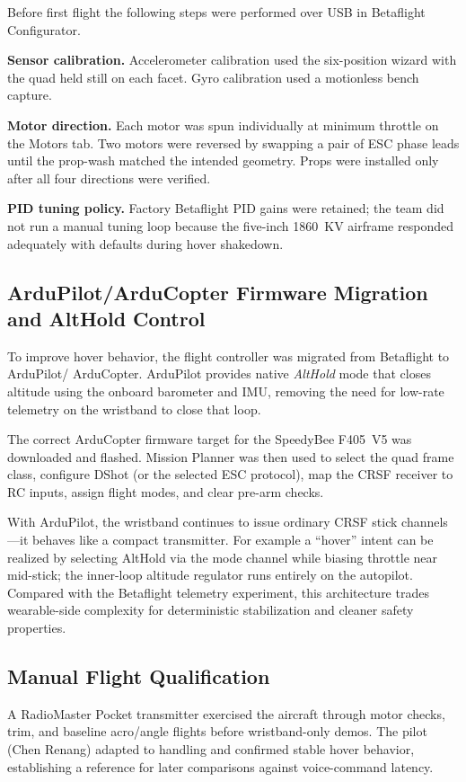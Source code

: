 Before first flight the following steps were performed over USB in Betaflight Configurator.

\textbf{Sensor calibration.}
Accelerometer calibration used the six-position wizard with the quad held still on each facet.
Gyro calibration used a motionless bench capture.

\textbf{Motor direction.}
Each motor was spun individually at minimum throttle on the Motors tab.
Two motors were reversed by swapping a pair of ESC phase leads until the prop-wash matched the
intended geometry.
Props were installed only after all four directions were verified.

\textbf{PID tuning policy.}
Factory Betaflight PID gains were retained; the team did not run a manual tuning loop because
the five-inch 1860~KV airframe responded adequately with defaults during hover shakedown.

\subsection{ArduPilot/ArduCopter Firmware Migration and AltHold Control}

To improve hover behavior, the flight controller was migrated from Betaflight to ArduPilot/
ArduCopter.
ArduPilot provides native \emph{AltHold} mode that closes altitude using the onboard barometer and
IMU, removing the need for low-rate telemetry on the wristband to close that loop.

The correct ArduCopter firmware target for the SpeedyBee F405~V5 was downloaded and flashed.
Mission Planner was then used to select the quad frame class, configure DShot (or the selected ESC
protocol), map the CRSF receiver to RC inputs, assign flight modes, and clear pre-arm checks.

With ArduPilot, the wristband continues to issue ordinary CRSF stick channels---it behaves like a
compact transmitter.
For example a ``hover'' intent can be realized by selecting AltHold via the mode channel while biasing
throttle near mid-stick; the inner-loop altitude regulator runs entirely on the autopilot.
Compared with the Betaflight telemetry experiment, this architecture trades wearable-side complexity
for deterministic stabilization and cleaner safety properties.

\subsection{Manual Flight Qualification}

A RadioMaster Pocket transmitter exercised the aircraft through motor checks, trim, and baseline
acro/angle flights before wristband-only demos.
The pilot (Chen Renang) adapted to handling and confirmed stable hover behavior, establishing a
reference for later comparisons against voice-command latency.
